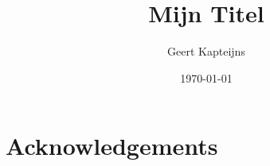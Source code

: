 \documentclass[9pt, ebook, openany, oneside]{memoir}
\renewcommand{\afterchaptertitle}{%
 \vskip2em
 \hrule height 0.6pt
 \vskip2em
 }
\begin{document}
\pagestyle{simple}



\frontmatter

\title{Mijn Titel}
\author{Geert Kapteijns}
\date{\today}



\thispagestyle{empty}
\begin{abstract}

\end{abstract}

\cleardoublepage

\begingroup
\renewcommand{\afterchaptertitle}{\vskip1.5em}
\tableofcontents*
\endgroup

\renewcommand{\abstractname}{}
\renewcommand{\absnamepos}{empty}

\chapter{Acknowledgements}


\mainmatter
\end{document}
